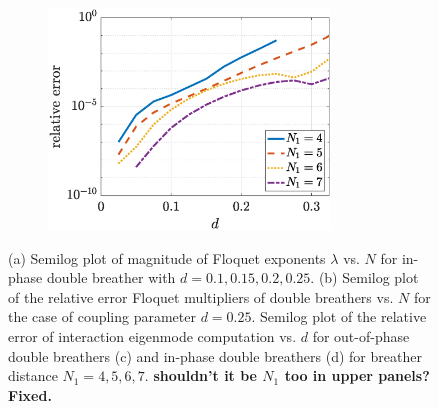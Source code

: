 \documentclass[12pt,reqno]{amsart}
\theoremstyle{definition}
\begin{document}
\begin{figure}
\begin{center}
\begin{subfigure}{0.45\linewidth}
		\caption{}
		\includegraphics[width=7.5cm]{doubleppeigerrord.eps} \hspace{-0.5cm}
		\label{fig:eigerrord} 
	\end{subfigure}
	\end{center}
	\caption{(a) Semilog plot of magnitude of Floquet exponents $\lambda$ vs. $N$ for in-phase double breather with $d = 0.1, 0.15, 0.2, 0.25$. (b) Semilog plot of the relative error Floquet multipliers of double breathers vs. $N$ for the case of 
	coupling parameter $d = 0.25$.
	Semilog plot of the relative error of interaction eigenmode computation vs. $d$ for out-of-phase double breathers (c) and in-phase double breathers (d) for breather distance $N_1 = 4,5,6,7$. {\bf shouldn't it be $N_1$ too in upper panels? Fixed.}}
	\label{fig:eigerror}
\end{figure}
\end{document}

